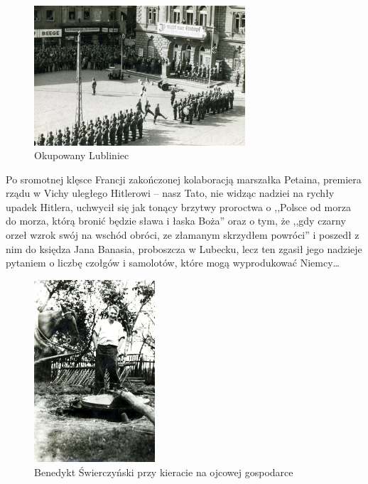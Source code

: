 \begin{figure}[!h]
\begin{center}
\includegraphics[width=0.7\textwidth]{photo/lubliniec_okupowany.jpg}
\caption{Okupowany Lubliniec}
\end{center}
\end{figure}

Po sromotnej klęsce Francji zakończonej kolaboracją marszałka Petaina, premiera rządu w Vichy uległego Hitlerowi -- nasz Tato, nie widząc nadziei na rychły upadek Hitlera, uchwycił się jak tonący brzytwy proroctwa o ,,Polsce od morza do morza, którą bronić będzie sława i łaska Boża'' oraz o tym, że ,,gdy czarny orzeł wzrok swój na wschód obróci, ze złamanym skrzydłem powróci'' i poszedł z nim do księdza Jana Banasia, proboszcza w Lubecku, lecz ten zgasił jego nadzieje pytaniem o liczbę czołgów i samolotów, które mogą wyprodukować Niemcy\ldots

\begin{figure}[!h]
\begin{center}
\includegraphics[width=0.4\textwidth]{photo/benedykt_swierczynski_przy_kieracie.jpg}
\caption{Benedykt Świerczyński przy kieracie na ojcowej gospodarce}
\end{center}
\end{figure}

